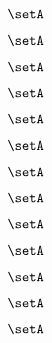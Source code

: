 \begin{forslides}
     \begin{equation}
        \label{eq:combination-155}
        \setA
    \end{equation}
    
    \begin{equation}
        \label{eq:combination-156}
        \setA
    \end{equation}
    
     \begin{equation}
        \label{eq:combination-157}
        \setA
    \end{equation}
    
     \begin{equation}
        \label{eq:combination-158}
        \setA
    \end{equation}
    
    \begin{equation}
        \label{eq:combination-159}
       \setA
    \end{equation}
    
       \begin{equation}
        \label{eq:combination-160}
        \setA
    \end{equation}
       
     \begin{equation}
        \label{eq:combination-161}
        \setA
    \end{equation}
    
     \begin{equation}
        \label{eq:combination-162}
        \setA
    \end{equation}
    
    \begin{equation}
        \label{eq:combination-163}
        \setA
    \end{equation}
    
     \begin{equation}
        \label{eq:combination-164}
        \setA
    \end{equation}
    
     \begin{equation}
        \label{eq:combination-165}
        \setA
    \end{equation}
    
    \begin{equation}
        \label{eq:combination-166}
        \setA
    \end{equation}
    
     \begin{equation}
        \label{eq:combination-167}
        \setA
    \end{equation}
    

\end{forslides}
